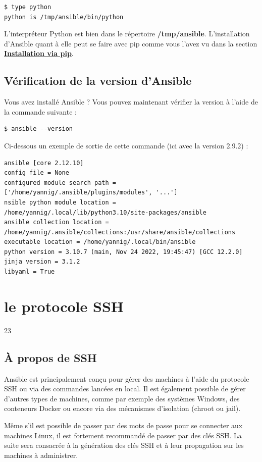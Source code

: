 \documentclass[hidelinks]{article}
\begin{document}
\begin{verbatim}
$ type python
python is /tmp/ansible/bin/python
\end{verbatim}

L'interpréteur Python est bien dans le répertoire \textbf{/tmp/ansible}.
L'installation d'Ansible quant à elle peut se faire avec pip comme vous l'avez vu dans la section \hyperref[subsec:Installation via pip]{\textbf{Installation via pip}}.

\subsection{Vérification de la version d'Ansible}
Vous avez installé Ansible ? Vous pouvez maintenant vérifier la version à l'aide de la commande suivante :
\begin{verbatim}
$ ansible --version
\end{verbatim}

Ci-dessous un exemple de sortie de cette commande (ici avec la version 2.9.2) :
\begin{verbatim}
ansible [core 2.12.10]
config file = None 
configured module search path = ['/home/yannig/.ansible/plugins/modules', '...'] 
nsible python module location = 
/home/yannig/.local/lib/python3.10/site-packages/ansible 
ansible collection location = 
/home/yannig/.ansible/collections:/usr/share/ansible/collections 
executable location = /home/yannig/.local/bin/ansible 
python version = 3.10.7 (main, Nov 24 2022, 19:45:47) [GCC 12.2.0]
jinja version = 3.1.2 
libyaml = True
\end{verbatim}

\section{le protocole SSH}
\label{sec:le protocole SSH}
23

\subsection{À propos de SSH}
Ansible est principalement conçu pour gérer des machines à l'aide du protocole SSH ou via des commandes lancées en local. Il est également possible de gérer d'autres types de machines, comme par exemple des systèmes Windows, des conteneurs Docker ou encore via des mécanismes d'isolation (chroot ou jail).

Même s'il est possible de passer par des mots de passe pour se connecter aux machines Linux, il est fortement recommandé de passer par des clés SSH. La suite sera consacrée à la génération des clés SSH et à leur propagation sur les machines à administrer.
\end{document}
